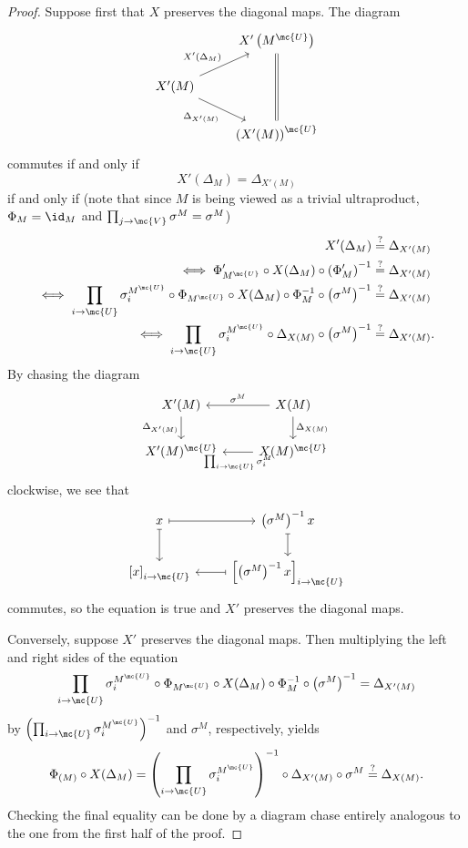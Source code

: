\begin{proof}
  Suppose first that $X$ preserves the diagonal maps. The diagram
$$  \begin{tikzcd}[ampersand replacement = \&]
    \& X'\left(M^{\mc{U}}\right) \arrow[equals]{dd}\\
X'(M) \arrow{ur}{X'\left(\Delta_M\right)} \arrow[swap]{dr}{\Delta_{X'(M)}}    \& \\
    \& \left(X'(M)\right)^{\mc{U}}
  \end{tikzcd}$$
  commutes if and only if
  $$
X'(\Delta_M) = \Delta_{X'(M)}
$$
if and only if (note that since $M$ is being viewed as a trivial ultraproduct, $\Phi_M = \id_M$ and $\prod_{j \to \mc{V}} \sigma^M = \sigma^M$)
\begin{align*}
  X'(\Delta_M) &\overset{?}{=} \Delta_{X'(M)} \\
\iff \Phi'_{M^{\mc{U}}} \circ X(\Delta_M) \circ \left( \Phi'_M\right)^{-1}               &\overset{?}{=} \Delta_{X'(M)} \\
\iff \prod_{i \to \mc{U}} \sigma_i^{M^{\mc{U}}} \circ \Phi_{M^{\mc{U}}} \circ X(\Delta_M) \circ \Phi^{-1}_M \circ \left(\sigma^M\right)^{-1} &\overset{?}{=} \Delta_{X'(M)} \\
\iff \prod_{i \to \mc{U}} \sigma_i^{M^{\mc{U}}} \circ \Delta_{X(M)} \circ \left(\sigma^M\right)^{-1}               &\overset{?}{=} \Delta_{X'(M)}.
\end{align*}
By chasing the diagram
$$
\begin{tikzcd}[ampersand replacement = \&]
 X'(M) \arrow[swap]{d}{\Delta_{X'(M)}} \& X(M) \arrow[swap]{l}{\sigma^M} \arrow{d}{\Delta_{X(M)}} \\
  X'(M)^{\mc{U}} \& X(M)^{\mc{U}} \arrow{l}{\prod_{i \to \mc{U}} \sigma_i^M}
\end{tikzcd}
$$
clockwise, we see that
$$
\begin{tikzcd}[ampersand replacement = \&]
x \arrow[mapsto]{r} \arrow[mapsto]{d}  \& \left(\sigma^M\right)^{-1} x \arrow[mapsto]{d} \\
\left[x\right]_{i \to \mc{U}}  \& \left[\left(\sigma^{M}\right)^{-1} x \right]_{i \to \mc{U}} \arrow[mapsto]{l}
\end{tikzcd}
$$
commutes, so the equation is true and $X'$ preserves the diagonal maps.

Conversely, suppose $X'$ preserves the diagonal maps. Then multiplying the left and right sides of the equation
$$
\prod_{i \to \mc{U}} \sigma_i^{M^{\mc{U}}} \circ \Phi_{M^{\mc{U}}} \circ X(\Delta_M) \circ \Phi^{-1}_M \circ \left(\sigma^M\right)^{-1} = \Delta_{X'(M)}
$$
by $\left(\prod_{i \to \mc{U}} \sigma_i^{M^{\mc{U}}} \right)^{-1}$ and $\sigma^M$, respectively, yields
$$
\Phi_{(M)} \circ X(\Delta_M) = \left(\prod_{i \to \mc{U}} \sigma_i^{M^{\mc{U}}} \right)^{-1} \circ \Delta_{X'(M)} \circ \sigma^M \overset{?}{=} \Delta_{X(M)}.
$$
Checking the final equality can be done by a diagram chase entirely analogous to the one from the first half of the proof.
\end{proof}

